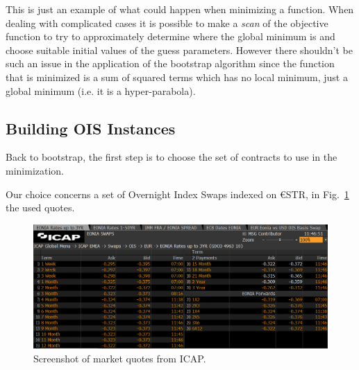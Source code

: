 This is just an example of what could happen when minimizing a function. When dealing with complicated cases it is possible to make a \emph{scan} of the objective function to try to approximately determine where the global minimum is and choose suitable initial values of the guess parameters.
However there shouldn't be such an issue in the application of the bootstrap algorithm since the function that is minimized is a sum of squared terms which has no local minimum, just a global minimum (i.e. it is a hyper-parabola).

\subsection{Building OIS Instances}
\label{building-ois-instances}

Back to bootstrap, the first step is to choose the set of contracts to use in the minimization.


Our choice concerns a set of Overnight Index Swaps indexed on \euro STR, in Fig.~\ref{fig:icap} the used quotes.
 
\begin{figure}[bth]
	\centering
	\includegraphics[width=1.\linewidth]{figures/icap_3.png}
	\caption{Screenshot of market quotes from ICAP.}
	\label{fig:icap}
\end{figure}


